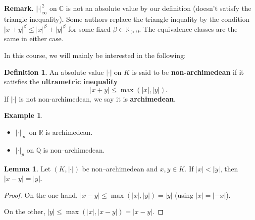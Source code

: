 \documentclass{article}
\theoremstyle{definition}
\newtheorem{lemma}[theorem]{Lemma}
\newtheorem{example}{Example}[section]
\newtheorem{defn}{Definition}[section]
\begin{document}
\textbf{Remark.} $|\cdot|_{\infty}^2$ on $\mathbb{C}$ is not an absolute value by our definition (doesn't satisfy the triangle inequality). Some authors replace the triangle inquality by the condition $|x+y|^{\beta} \le |x|^{\beta} + |y|^{\beta}$ for some fixed $\beta \in \mathbb{R}_{>0}$. The equivalence classes are the same in either case.

In this course, we will mainly be interested in the following:

\begin{defn}
    An absolute value $|\cdot|$ on $K$ is said to be \textbf{non-archimedean} if it satisfies the \textbf{ultrametric inequality} \[
    |x+y|\le \max(|x|,|y|).
    \]
    If $|\cdot|$ is not non-archimedean, we say it is \textbf{archimedean}. 
\end{defn}
\begin{example}
    \begin{itemize}
        \item $|\cdot|_{\infty}$ on $\mathbb{R}$ is archimedean.
        \item $|\cdot|_{p}$ on $\mathbb{Q}$ is non--archimedean.
    \end{itemize}
\end{example}

\begin{lemma}
    Let $(K, |\cdot|)$ be non--archimedean and $x,y \in K$. If $|x|<|y|$, then $|x-y|= |y|$.
\end{lemma}
\begin{proof}
    On the one hand, $|x-y|\le \max(|x|,|y|) = |y|$ (using $|x|=|-x|$).
    \vspace{1mm}
     
    On the other, $|y| \le \max(|x|, |x-y|) = |x-y|$.
\end{proof}
\end{document}
